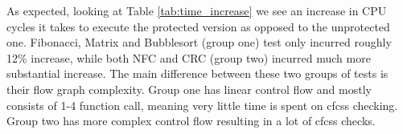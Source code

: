 \begin{table}[h]
\centering
{}
\caption{Execution time comparison between unprotected and protected tests}
\label{tab:time_increase}
\end{table}

As expected, looking at Table \ref{tab:time_increase} we see an increase in CPU cycles it takes to execute the protected version as opposed to the unprotected one. Fibonacci, Matrix and Bubblesort (group one) test only incurred roughly 12\% increase, while both NFC and CRC (group two) incurred much more substantial increase. The main difference between these two groups of tests is their flow graph complexity. Group one has linear control flow and mostly consists of 1-4 function call, meaning very little time is spent on \acrshort{cfcss} checking. Group two has more complex control flow resulting in a lot of \acrshort{cfcss} checks.



